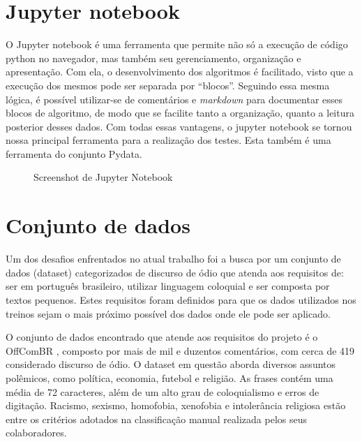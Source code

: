 \section{Jupyter notebook}

O Jupyter notebook é uma ferramenta que permite não só a execução de código python no navegador, mas também seu gerenciamento, organização e apresentação. Com ela, o desenvolvimento dos algoritmos é facilitado, visto que a execução dos mesmos pode ser separada por “blocos”. Seguindo essa mesma lógica, é possível utilizar-se de comentários e \textit{markdown} para documentar esses blocos de algoritmo, de modo que se facilite tanto a organização, quanto a leitura posterior desses dados. Com todas essas vantagens, o jupyter notebook se tornou nossa principal ferramenta para a realização dos testes. Esta também é uma ferramenta do conjunto Pydata.

\begin{figure}[!htb]
    \caption{\label{fig:jupyter} Screenshot de Jupyter Notebook}
\end{figure}

\section{Conjunto de dados}

Um dos desafios enfrentados no atual trabalho foi a busca por um conjunto de dados (dataset) categorizados de discurso de ódio que atenda aos requisitos de: ser em português brasileiro, utilizar linguagem coloquial e ser composta por textos pequenos. Estes requisitos foram definidos para que os dados utilizados nos treinos sejam o mais próximo possível dos dados onde ele pode ser aplicado.

O conjunto de dados encontrado que atende aos requisitos do projeto é o OffComBR \cite{Pelle2017}, composto por mais de mil e duzentos comentários, com cerca de 419 considerado discurso de ódio. O dataset em questão aborda diversos assuntos polêmicos, como política, economia, futebol e religião. As frases contém uma média de 72 caracteres, além de um alto grau de coloquialismo e erros de digitação. Racismo, sexismo, homofobia, xenofobia e intolerância religiosa estão entre os critérios adotados na classificação manual realizada pelos seus colaboradores.

